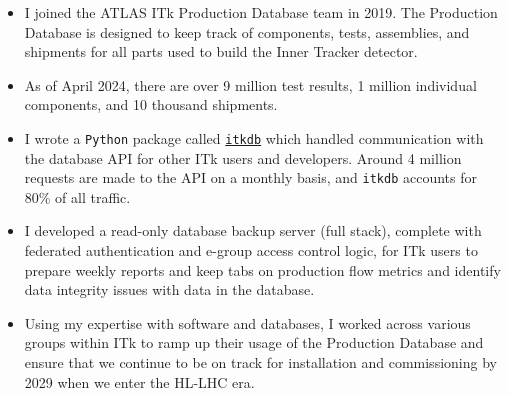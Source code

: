 \begin{itemize}
	\item I joined the ATLAS ITk Production Database team in 2019. The Production Database is designed to keep track of components, tests, assemblies, and shipments for all parts used to build the Inner Tracker detector.
	\item As of April 2024, there are over 9 million test results, 1 million individual components, and 10 thousand shipments.
	\item I wrote a \texttt{Python} package called \href{https://itkdb.docs.cern.ch/latest/}{\texttt{itkdb}} which handled communication with the database API for other ITk users and developers. Around 4 million requests are made to the API on a monthly basis, and \texttt{itkdb} accounts for 80\% of all traffic.
	\item I developed a read-only database backup server (full stack), complete with federated authentication and e-group access control logic, for ITk users to prepare weekly reports and keep tabs on production flow metrics and identify data integrity issues with data in the database.
	\item Using my expertise with software and databases, I worked across various groups within ITk to ramp up their usage of the Production Database and ensure that we continue to be on track for installation and commissioning by 2029 when we enter the HL-LHC era.
\end{itemize}

\\

